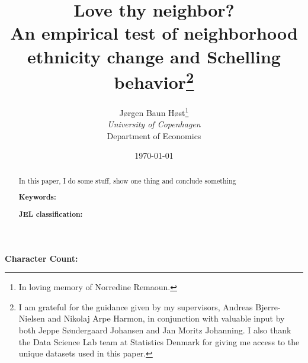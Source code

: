 \documentclass[12pt,a4paper]{article}
\author {
        Jørgen Baun Høst\thanks{In loving memory of Norredine Remaoun.}\\
        \small \textit{University of Copenhagen} \\
        \small Department of Economics}
\title{Love thy neighbor?\\
\vspace{0.35cm}
\large An empirical test of neighborhood ethnicity change and Schelling behavior\thanks{I am grateful for the guidance given by my supervisors, Andreas Bjerre-Nielsen and Nikolaj Arpe Harmon, in conjunction with valuable input by both Jeppe Søndergaard Johansen and Jan Moritz Johanning. I also thank the Data Science Lab team at Statistics Denmark for giving me access to the unique datasets used in this paper.}
\vspace{0.35cm}
}
\date{\today}
\begin{document}
\begin{spacing}{1}
\maketitle    
\end{spacing}

\vspace*{-1cm}
\begin{abstract}
\noindent
In this paper, I do some stuff, show one thing and conclude something

\medskip
\noindent
\textbf{Keywords:}

\medskip
\noindent
\textbf{JEL classification:} 
\end{abstract}


\newpage 
\begingroup
\begin{spacing}{1.25}
\tableofcontents
\end{spacing}
\endgroup


\vspace{1.5cm}
\begin{center}
\textbf{Character Count:} 
\end{center}

\pagebreak


\pagebreak

 

\pagebreak

 

\pagebreak

 

\pagebreak

 

\pagebreak



\pagebreak

    \printbibliography


\pagebreak


\appendix
\appendixpage


\end{document}
